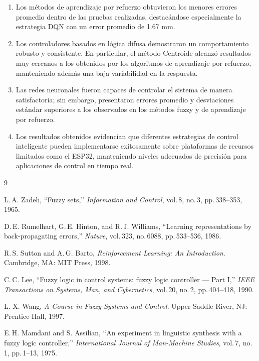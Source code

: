 \documentclass[conference]{IEEEtran}
\begin{document}
\begin{enumerate}
\item Los métodos de aprendizaje por refuerzo obtuvieron los menores errores promedio dentro de las pruebas realizadas, destacándose especialmente la estrategia DQN con un error promedio de 1.67 mm.

\item Los controladores basados en lógica difusa demostraron un comportamiento robusto y consistente. En particular, el método Centroide alcanzó resultados muy cercanos a los obtenidos por los algoritmos de aprendizaje por refuerzo, manteniendo además una baja variabilidad en la respuesta.

\item Las redes neuronales fueron capaces de controlar el sistema de manera satisfactoria; sin embargo, presentaron errores promedio y desviaciones estándar superiores a los observados en los métodos fuzzy y de aprendizaje por refuerzo.

\item Los resultados obtenidos evidencian que diferentes estrategias de control inteligente pueden implementarse exitosamente sobre plataformas de recursos limitados como el ESP32, manteniendo niveles adecuados de precisión para aplicaciones de control en tiempo real.
\end{enumerate}

\begin{thebibliography}{9}

L.\,A. Zadeh,
``Fuzzy sets,''
\textit{Information and Control}, vol.\,8, no.\,3, pp.\,338--353, 1965.

D.\,E. Rumelhart, G.\,E. Hinton, and R.\,J. Williams,
``Learning representations by back-propagating errors,''
\textit{Nature}, vol.\,323, no.\,6088, pp.\,533--536, 1986.

R.\,S. Sutton and A.\,G. Barto,
\textit{Reinforcement Learning: An Introduction}.
Cambridge, MA: MIT Press, 1998.

C.\,C. Lee,
``Fuzzy logic in control systems: fuzzy logic controller — Part I,''
\textit{IEEE Transactions on Systems, Man, and Cybernetics}, vol.\,20, no.\,2, pp.\,404--418, 1990.

L.-X. Wang,
\textit{A Course in Fuzzy Systems and Control}.
Upper Saddle River, NJ: Prentice-Hall, 1997.

E.\,H. Mamdani and S. Assilian,
``An experiment in linguistic synthesis with a fuzzy logic controller,''
\textit{International Journal of Man-Machine Studies}, vol.\,7, no.\,1, pp.\,1--13, 1975.

\end{thebibliography}
\end{document}
